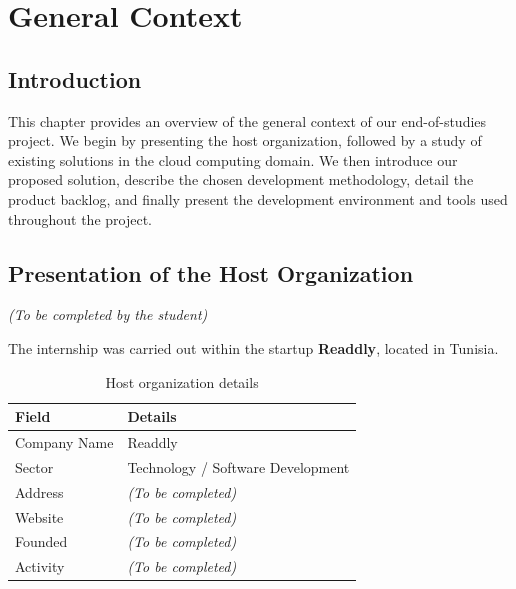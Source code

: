 \chapter{General Context}

\section{Introduction}

This chapter provides an overview of the general context of our end-of-studies project. We begin by presenting the host organization, followed by a study of existing solutions in the cloud computing domain. We then introduce our proposed solution, describe the chosen development methodology, detail the product backlog, and finally present the development environment and tools used throughout the project.

\section{Presentation of the Host Organization}


\textit{(To be completed by the student)}

\vspace{0.5cm}
\noindent The internship was carried out within the startup \textbf{Readdly}, located in Tunisia.

\begin{table}[H]
\centering
\caption{Host organization details}
\label{tab:host-org}
\begin{tabularx}{\textwidth}{|l|X|}
\hline
\rowcolor{blue!15}
\textbf{Field} & \textbf{Details} \\
\hline
Company Name & Readdly \\
\hline
Sector & Technology / Software Development \\
\hline
Address & \textit{(To be completed)} \\
\hline
Website & \textit{(To be completed)} \\
\hline
Founded & \textit{(To be completed)} \\
\hline
Activity & \textit{(To be completed)} \\
\hline
\end{tabularx}
\end{table}

